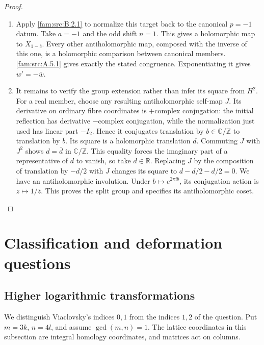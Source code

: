 \begin{proof}
\begin{enumerate}[label=\arabic*.,leftmargin=*]
\item Apply \ref{fam:src:B.2.1} to normalize this target back to the canonical $p=-1$ datum. Take $a=-1$ and the odd shift $n=1$. This gives a holomorphic map to $X_{1-\bar c}$. Every other antiholomorphic map, composed with the inverse of this one, is a holomorphic comparison between canonical members. \ref{fam:src:A.5.1} gives exactly the stated congruence. Exponentiating it gives $w'=-\bar w$.

\item It remains to verify the group extension rather than infer its square from $H^2$. For a real member, choose any resulting antiholomorphic self-map $J$. Its derivative on ordinary fibre coordinates is $+\text{complex conjugation}$: the initial reflection has derivative $-\text{complex conjugation}$, while the normalization just used has linear part $-I_2$. Hence it conjugates translation by $b\in\mathbb C/\mathbb Z$ to translation by $\bar b$. Its square is a holomorphic translation $d$. Commuting $J$ with $J^2$ shows $d=\bar d$ in $\mathbb C/\mathbb Z$. This equality forces the imaginary part of a representative of $d$ to vanish, so take $d\in\mathbb R$. Replacing $J$ by the composition of translation by $-d/2$ with $J$ changes its square to $d-d/2-d/2=0$. We have an antiholomorphic involution. Under $b\mapsto e^{2\pi ib}$, its conjugation action is $z\mapsto1/\bar z$. This proves the split group and specifies its antiholomorphic coset.
\end{enumerate}
\end{proof}



\section{Classification and deformation questions}\label{push:section:E}
\subsection{Higher logarithmic transformations}\label{push:section:E.1}
We distinguish Viaclovsky's indices $0,1$ from the indices $1,2$ of
the question.  Put $m=3k$, $n=4l$, and assume $\gcd(m,n)=1$.
The lattice coordinates in this subsection are integral homology
coordinates, and matrices act on columns.

